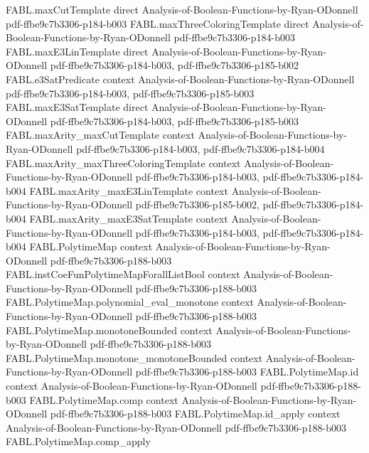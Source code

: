 \begin{theorem}
\proofstep
  {FABL.maxCutTemplate}
  {direct}
  {Analysis-of-Boolean-Functions-by-Ryan-ODonnell}
  {pdf-ffbe9c7b3306-p184-b003}
\proofstep
  {FABL.maxThreeColoringTemplate}
  {direct}
  {Analysis-of-Boolean-Functions-by-Ryan-ODonnell}
  {pdf-ffbe9c7b3306-p184-b003}
\proofstep
  {FABL.maxE3LinTemplate}
  {direct}
  {Analysis-of-Boolean-Functions-by-Ryan-ODonnell}
  {pdf-ffbe9c7b3306-p184-b003,
    pdf-ffbe9c7b3306-p185-b002}
\proofstep
  {FABL.e3SatPredicate}
  {context}
  {Analysis-of-Boolean-Functions-by-Ryan-ODonnell}
  {pdf-ffbe9c7b3306-p184-b003,
    pdf-ffbe9c7b3306-p185-b003}
\proofstep
  {FABL.maxE3SatTemplate}
  {direct}
  {Analysis-of-Boolean-Functions-by-Ryan-ODonnell}
  {pdf-ffbe9c7b3306-p184-b003,
    pdf-ffbe9c7b3306-p185-b003}
\proofstep
  {FABL.maxArity_maxCutTemplate}
  {context}
  {Analysis-of-Boolean-Functions-by-Ryan-ODonnell}
  {pdf-ffbe9c7b3306-p184-b003,
    pdf-ffbe9c7b3306-p184-b004}
\proofstep
  {FABL.maxArity_maxThreeColoringTemplate}
  {context}
  {Analysis-of-Boolean-Functions-by-Ryan-ODonnell}
  {pdf-ffbe9c7b3306-p184-b003,
    pdf-ffbe9c7b3306-p184-b004}
\proofstep
  {FABL.maxArity_maxE3LinTemplate}
  {context}
  {Analysis-of-Boolean-Functions-by-Ryan-ODonnell}
  {pdf-ffbe9c7b3306-p185-b002,
    pdf-ffbe9c7b3306-p184-b004}
\proofstep
  {FABL.maxArity_maxE3SatTemplate}
  {context}
  {Analysis-of-Boolean-Functions-by-Ryan-ODonnell}
  {pdf-ffbe9c7b3306-p184-b003,
    pdf-ffbe9c7b3306-p184-b004}
\proofstep
  {FABL.PolytimeMap}
  {context}
  {Analysis-of-Boolean-Functions-by-Ryan-ODonnell}
  {pdf-ffbe9c7b3306-p188-b003}
\proofstep
  {FABL.instCoeFunPolytimeMapForallListBool}
  {context}
  {Analysis-of-Boolean-Functions-by-Ryan-ODonnell}
  {pdf-ffbe9c7b3306-p188-b003}
\proofstep
  {FABL.PolytimeMap.polynomial_eval_monotone}
  {context}
  {Analysis-of-Boolean-Functions-by-Ryan-ODonnell}
  {pdf-ffbe9c7b3306-p188-b003}
\proofstep
  {FABL.PolytimeMap.monotoneBounded}
  {context}
  {Analysis-of-Boolean-Functions-by-Ryan-ODonnell}
  {pdf-ffbe9c7b3306-p188-b003}
\proofstep
  {FABL.PolytimeMap.monotone_monotoneBounded}
  {context}
  {Analysis-of-Boolean-Functions-by-Ryan-ODonnell}
  {pdf-ffbe9c7b3306-p188-b003}
\proofstep
  {FABL.PolytimeMap.id}
  {context}
  {Analysis-of-Boolean-Functions-by-Ryan-ODonnell}
  {pdf-ffbe9c7b3306-p188-b003}
\proofstep
  {FABL.PolytimeMap.comp}
  {context}
  {Analysis-of-Boolean-Functions-by-Ryan-ODonnell}
  {pdf-ffbe9c7b3306-p188-b003}
\proofstep
  {FABL.PolytimeMap.id_apply}
  {context}
  {Analysis-of-Boolean-Functions-by-Ryan-ODonnell}
  {pdf-ffbe9c7b3306-p188-b003}
\proofstep
  {FABL.PolytimeMap.comp_apply}

\end{theorem}
